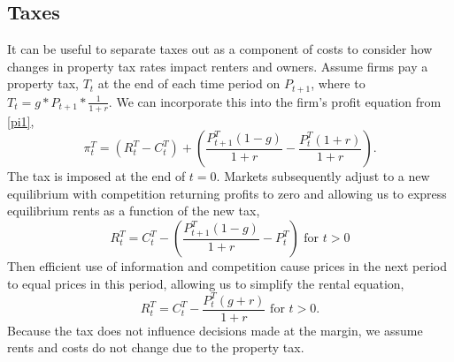 \documentclass[ecta,nameyear,draft]{econsocart}
\theoremstyle{plain}
\theoremstyle{remark}
\begin{document}
\subsection{Taxes}
It can be useful to separate taxes out as a component of costs to consider how changes in property tax rates impact renters and owners. Assume firms pay a property tax, $T_t$ at the end of each time period on $P_{t+1}$, where to $T_t=g*P_{t+1}*\frac{1}{1+r}$. We can incorporate this into the firm's profit equation from \ref{pi1},
\begin{equation}
	\pi^T_t = (R^T_t-C^T_t)+\left(\frac{P^T_{t+1}(1-g)}{1+r}-\frac{P^T_t(1+r)}{1+r}\right).\label{pi1T}
\end{equation}
The tax is imposed at the end of $t=0$. Markets subsequently adjust to a new equilibrium with competition returning profits to zero and allowing us to express equilibrium rents as a function of the new tax,
\begin{equation*}
	R^T_t=C^T_t-\left(\frac{P^T_{t+1}(1-g)}{1+r}-P^T_t\right) \text{ for }t>0
\end{equation*}
Then efficient use of information and competition cause prices in the next period to equal prices in this period, allowing us to simplify the rental equation,
\begin{equation*}
R^T_t=C^T_t-\frac{P^T_{t}(g+r)}{1+r}\text{ for }t>0.
\end{equation*}
Because the tax does not influence decisions made at the margin, we assume rents and costs do not change due to the property tax. 
\end{document}
